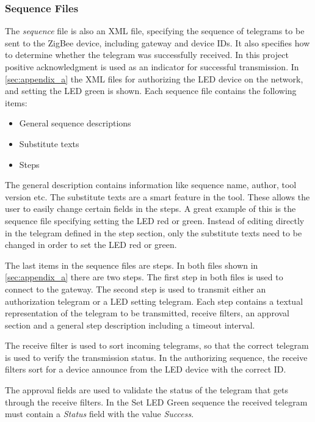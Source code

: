 \documentclass[Main]{subfiles}
\begin{document}
		\subsubsection{Sequence Files}
			The \emph{sequence} file is also an XML file, specifying the sequence of telegrams to be sent to the ZigBee device, including gateway and device IDs. 
			It also specifies how to determine whether the telegram was successfully received. 
			In this project positive acknowledgment is used as an indicator for successful transmission.
			In \ref{sec:appendix_a} the XML files for authorizing the LED device on the network, and setting the LED green is shown.
			Each sequence file contains the following items: 
			\begin{itemize}
				\item General sequence descriptions
				\item Substitute texts
				\item Steps
			\end{itemize}
			The general description contains information like sequence name, author, tool version etc.
			The substitute texts are a smart feature in the tool. 
			These allows the user to easily change certain fields in the steps. 
			A great example of this is the sequence file specifying setting the LED red or green.
			Instead of editing directly in the telegram defined in the step section, only the substitute texts need to be changed in order to set the LED red or green. 

			The last items in the sequence files are steps. 
			In both files shown in \ref{sec:appendix_a} there are two steps. 
			The first step in both files is used to connect to the gateway.
			The second step is used to transmit either an authorization telegram or a LED setting telegram.
			Each step contains a textual representation of the telegram to be transmitted, receive filters, an approval section and a general step description including a timeout interval.

			The receive filter is used to sort incoming telegrams, so that the correct telegram is used to verify the transmission status. 
			In the authorizing sequence, the receive filters sort for a device announce from the LED device with the correct ID.
			
			The approval fields are used to validate the status of the telegram that gets through the receive filters. 
			In the Set LED Green sequence the received telegram must contain a \emph{Status} field with the value \emph{Success}.
\end{document}
